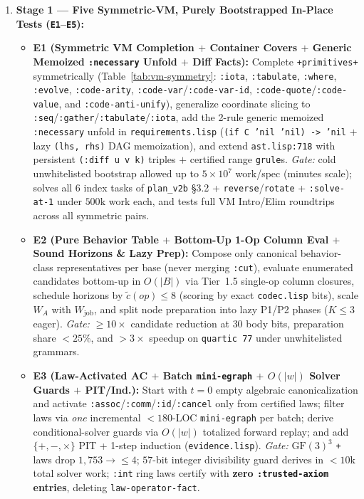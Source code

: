 \documentclass[12pt]{article}
\begin{document}
\begin{enumerate}[leftmargin=1.6em, itemsep=0.25em]
  \item \textbf{Stage 1 --- Five Symmetric-VM, Purely Bootstrapped In-Place Tests (\texttt{E1}--\texttt{E5}):}
  \begin{itemize}[leftmargin=1.4em, itemsep=0.12em]
    \item \textbf{E1 (Symmetric VM Completion $+$ Container Covers $+$ Generic Memoized \texttt{:necessary} Unfold $+$ Diff Facts):} Complete \texttt{+primitives+} symmetrically (Table~\ref{tab:vm-symmetry}: \texttt{:iota}, \texttt{:tabulate}, \texttt{:where}, \texttt{:evolve}, \texttt{:code-arity}, \texttt{:code-\allowbreak var}/\allowbreak\texttt{:code-\allowbreak var-id}, \texttt{:code-\allowbreak quote}/\allowbreak\texttt{:code-\allowbreak value}, and \texttt{:code-\allowbreak anti-\allowbreak unify}), generalize coordinate slicing to \texttt{:seq}/\allowbreak\texttt{:gather}/\allowbreak\texttt{:tabulate}/\allowbreak\texttt{:iota}, add the 2-rule generic memoized \texttt{:necessary} unfold in \texttt{requirements.lisp} (\texttt{(if C 'nil 'nil) -> 'nil} $+$ lazy \texttt{(lhs, rhs)} DAG memoization), and extend \texttt{ast.lisp:718} with persistent \texttt{(:diff u v k)} triples $+$ certified range \texttt{grule}s. \emph{Gate:} cold unwhitelisted bootstrap allowed up to $5\times 10^7$ work/spec (minutes scale); solves all $6$ index tasks of \texttt{plan\_v2b} \S3.2 + \texttt{reverse}/\texttt{rotate} + \texttt{:solve-at-1} under $500\mathrm{k}$ work each, and tests full VM Intro/Elim roundtrips across all symmetric pairs.
    \item \textbf{E2 (Pure Behavior Table $+$ Bottom-Up 1-Op Column Eval $+$ Sound Horizons \& Lazy Prep):} Compose only canonical behavior-class representatives per base (never merging \texttt{:cut}), evaluate enumerated candidates bottom-up in $O(|B|)$ via Tier~1.5 single-op column closures, schedule horizons by $\tilde{c}(op)\le 8$ (scoring by exact \texttt{codec.lisp} bits), scale $W_A$ with $W_{\mathrm{job}}$, and split node preparation into lazy P1/P2 phases ($K\le 3$ eager). \emph{Gate:} $\ge 10\times$ candidate reduction at $30$ body bits, preparation share $<25\%$, and $>3\times$ speedup on \texttt{quartic 77} under unwhitelisted grammars.
    \item \textbf{E3 (Law-Activated AC $+$ Batch \texttt{mini-egraph} $+$ $O(|w|)$ Solver Guards $+$ PIT/Ind.):} Start with $t=0$ empty algebraic canonicalization and activate \texttt{:assoc}/\texttt{:comm}/\texttt{:id}/\texttt{:cancel} only from certified laws; filter laws via \emph{one} incremental $<180$-LOC \texttt{mini-egraph} per batch; derive conditional-solver guards via $O(|w|)$ totalized forward replay; and add $\{+,-,\times\}$ PIT + 1-step induction (\texttt{evidence.lisp}). \emph{Gate:} $\mathrm{GF}(3)^3$ \texttt{+} laws drop $1,753 \to \le 4$; $57$-bit integer divisibility guard derives in $<10\mathrm{k}$ total solver work; \texttt{:int} ring laws certify with \textbf{zero \texttt{:trusted-axiom} entries}, deleting \texttt{law-operator-fact}.

\end{itemize}
\end{enumerate}
\end{document}
